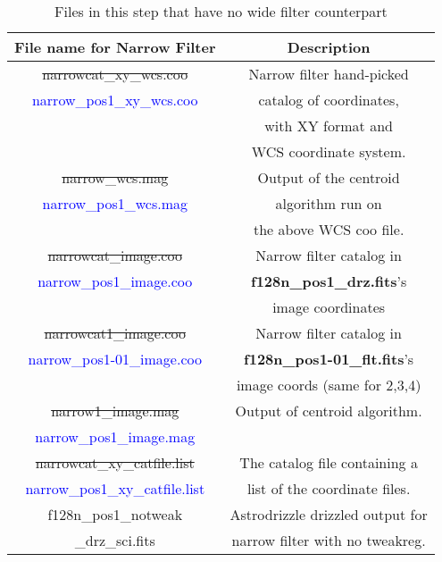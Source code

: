 \documentclass[11pt,obeyspaces]{article} %
\begin{document}
\begin{table}
\caption{Files in this step that have no wide filter counterpart}
\begin{center}
\begin{tabular}{|c|c|} \hline
File name for Narrow Filter & Description \\ \hline \hline
\sout{narrowcat\_xy\_wcs.coo} & Narrow filter hand-picked \\
\textcolor{blue}{narrow\_pos1\_xy\_wcs.coo} & catalog of coordinates,\\
 & with XY format and \\
 & WCS coordinate system.\\ \hline
\sout{narrow\_wcs.mag} & Output of the centroid \\
\textcolor{blue}{narrow\_pos1\_wcs.mag} & algorithm run on \\
 & the above WCS coo file.\\ \hline 
\sout{narrowcat\_image.coo} & Narrow filter catalog in \\
\textcolor{blue}{narrow\_pos1\_image.coo} & {\bf f128n\_pos1\_drz.fits}'s \\
 & image coordinates \\ \hline
\sout{narrowcat1\_image.coo} & Narrow filter catalog in \\
\textcolor{blue}{narrow\_pos1-01\_image.coo} &  {\bf f128n\_pos1-01\_flt.fits}'s \\
& image coords (same for 2,3,4)\\ \hline
\sout{narrow1\_image.mag} & Output of centroid algorithm. \\ 
\textcolor{blue}{narrow\_pos1\_image.mag} & \\ \hline 
\sout{narrowcat\_xy\_catfile.list} & The catalog file containing a \\ 
\textcolor{blue}{narrow\_pos1\_xy\_catfile.list} &  list of the coordinate files. \\ \hline
f128n\_pos1\_notweak & Astrodrizzle drizzled output for \\
\_drz\_sci.fits & narrow filter with no tweakreg. \\ \hline
\end{tabular}
\end{center}
\label{table:step1}
\end{table}
\end{document}
